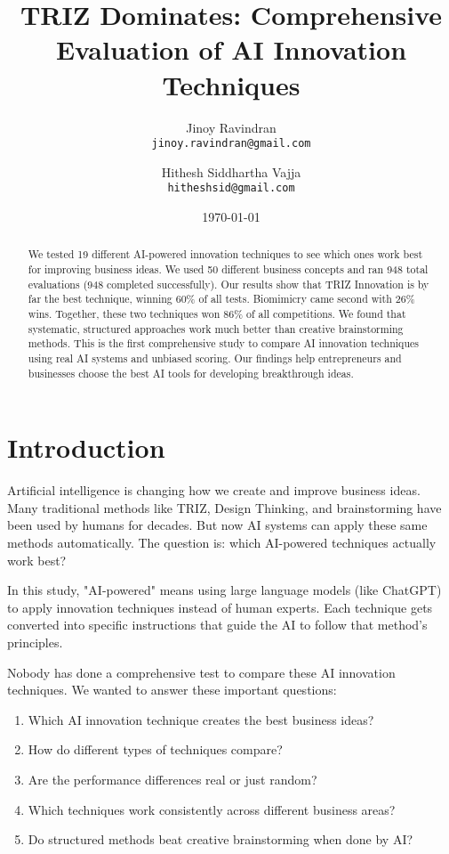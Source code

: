 \documentclass[12pt]{article}
\title{TRIZ Dominates: Comprehensive Evaluation of AI Innovation Techniques}
\author{
Jinoy Ravindran\\
\texttt{jinoy.ravindran@gmail.com}
\and
Hithesh Siddhartha Vajja\\
\texttt{hitheshsid@gmail.com}
}
\date{\today}
\begin{document}
\maketitle

\begin{abstract}
We tested 19 different AI-powered innovation techniques to see which ones work best for improving business ideas. We used 50 different business concepts and ran 948 total evaluations (948 completed successfully). Our results show that TRIZ Innovation is by far the best technique, winning 60\% of all tests. Biomimicry came second with 26\% wins. Together, these two techniques won 86\% of all competitions. We found that systematic, structured approaches work much better than creative brainstorming methods. This is the first comprehensive study to compare AI innovation techniques using real AI systems and unbiased scoring. Our findings help entrepreneurs and businesses choose the best AI tools for developing breakthrough ideas.
\end{abstract}

\section{Introduction}

Artificial intelligence is changing how we create and improve business ideas. Many traditional methods like TRIZ, Design Thinking, and brainstorming have been used by humans for decades. But now AI systems can apply these same methods automatically. The question is: which AI-powered techniques actually work best?

In this study, "AI-powered" means using large language models (like ChatGPT) to apply innovation techniques instead of human experts. Each technique gets converted into specific instructions that guide the AI to follow that method's principles.

Nobody has done a comprehensive test to compare these AI innovation techniques. We wanted to answer these important questions:

\begin{enumerate}
\item Which AI innovation technique creates the best business ideas?
\item How do different types of techniques compare?
\item Are the performance differences real or just random?
\item Which techniques work consistently across different business areas?
\item Do structured methods beat creative brainstorming when done by AI?
\end{enumerate}
\end{document}
